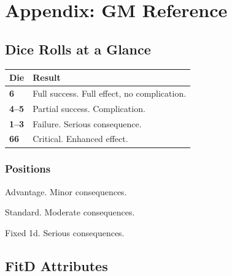 
\chapter{Appendix: GM Reference}
\label{ch:appendix}

\begin{multicols}{2}

\section{Dice Rolls at a Glance}
\label{sec:ref-rolls}

\begin{center}
\begin{tabular}{C{1.2cm} p{5cm}}
  \toprule
  \textbf{Die} & \textbf{Result} \\
  \midrule
  \textbf{6}   & Full success. Full effect, no complication. \\
  \textbf{4--5}& Partial success. Complication. \\
  \textbf{1--3}& Failure. Serious consequence. \\
  \textbf{66}  & Critical. Enhanced effect. \\
  \bottomrule
\end{tabular}
\end{center}

\subsection{Positions}
\begin{description}[leftmargin=3cm, style=nextline]
  \item[\idx{Controlled}] Advantage. Minor consequences.
  \item[\idx{Risky}]      Standard. Moderate consequences.
  \item[\idx{Desperate}]  Fixed 1d. Serious consequences.
\end{description}

\columnbreak

\section{FitD Attributes}
\label{sec:ref-attributes}


\end{multicols}
